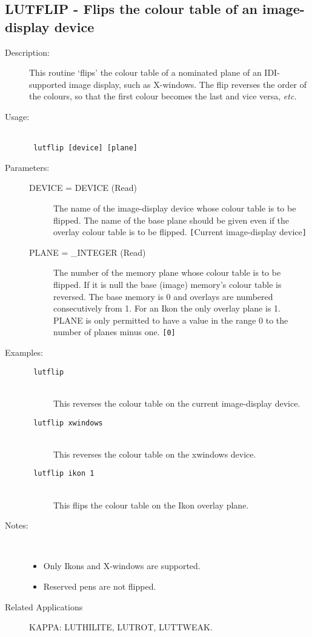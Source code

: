 \documentclass[twoside,11pt]{article}
\newcommand{\stardocinitials}  {SUN}
\newcommand{\stardocnumber}    {239.2}
\newcommand{\stardocname}{\stardocinitials /\stardocnumber}
\newcommand{\htmlref}[2]{#1}
\newcommand{\xlabel}[1]{}
\newlength{\sstbannerlength}
\newlength{\sstcaptionlength}
\newlength{\sstexampleslength}
\newlength{\sstexampleswidth}
\newcommand{\sstroutine}[3]{
   \goodbreak
   \markboth{{\stardocname}~ --- #1}{{\stardocname}~ --- #1}
   \rule{\textwidth}{0.5mm}
   \vspace{-7ex}
   \newline
   \settowidth{\sstbannerlength}{{\Large {\bf #1}}}
   \setlength{\sstcaptionlength}{\textwidth}
   \setlength{\sstexampleslength}{\textwidth}
   \addtolength{\sstbannerlength}{0.5em}
   \addtolength{\sstcaptionlength}{-2.0\sstbannerlength}
   \addtolength{\sstcaptionlength}{-4.9pt}
   \settowidth{\sstexampleswidth}{{\bf Examples:}}
   \addtolength{\sstexampleslength}{-\sstexampleswidth}
   \parbox[t]{\sstbannerlength}{\flushleft{\Large {\bf #1}}}
   \parbox[t]{\sstcaptionlength}{\center{\Large #2}}
   \parbox[t]{\sstbannerlength}{\flushright{\Large {\bf #1}}}
   \begin{description}
      #3
   \end{description}
}
\newcommand{\sstdescription}[1]{\item[Description:] #1}
\newcommand{\sstusage}[1]{\pagebreak[3] \item[Usage:] \mbox{} \\[1.3ex] {\ssttt #1}}
\newcommand{\sstparameters}[1]{
   \goodbreak 
   \item[Parameters:] \mbox{} \\
   \vspace{-3.5ex}
   \begin{description}
      #1
   \end{description}
}
\newcommand{\sstexamples}[1]{
   \goodbreak
   \item[Examples:] \mbox{} \\
   \vspace{-3.5ex}
   \begin{description}
      #1
   \end{description}
}
\newcommand{\sstsubsection}[1]{ \item[{#1}] \mbox{} \\}
\newcommand{\sstexamplesubsection}[2]{\sloppy \item{\ssttt #1} \mbox{} \\ #2 }
\newcommand{\sstnotes}[1]{\pagebreak[3] \item[Notes:] \mbox{} \\[1.3ex] #1}
\newcommand{\sstdiytopic}[2]{\goodbreak \item[{\hspace{-0.35em}#1\hspace{-0.35em}:}] \mbox{} \\[1.3ex] #2}
\newenvironment{sstitemize}{%
  \vspace{-4.3ex}\begin{itemize}}{\end{itemize}}
\newcommand{\sstitemlist}[1]{
  \mbox{} \\
  \vspace{-3.5ex}
  \begin{sstitemize}
     #1
  \end{sstitemize}
}
\newcommand{\sstitem}{\item}
\newcommand{\ssttt}{\tt}
\renewcommand{\sstroutine}[3]{
      \subsection{#1\xlabel{#1}-\label{#1}#2}
      \begin{description}
         #3
      \end{description}
   }
\renewcommand{\sstdescription}[1]{\item[Description:]
      \begin{description}
         #1
      \end{description}
   }
\renewcommand{\sstusage}[1]{\htmlref{\item[Usage:]}{ap:usage} \mbox{} \\ {\ssttt #1}}
\renewcommand{\sstparameters}[1]{
      \htmlref{\item[Parameters:]}{se:param}
      \begin{description}
         #1
      \end{description}
   }
\renewcommand{\sstexamples}[1]{
      \htmlref{\item[Examples:]}{ap:example}
      \begin{description}
         #1
      \end{description}
   }
\renewcommand{\sstsubsection}[1]{\item[{#1}]}
\renewcommand{\sstexamplesubsection}[2]{\item[{\ssttt #1}] \\ #2}
\renewcommand{\sstnotes}[1]{\item[Notes:]
      \begin{description}
         #1
      \end{description}
   }
\renewcommand{\sstdiytopic}[2]{\item[{#1}]
      \begin{description}
         #2
      \end{description}
   }
\newcommand{\sstitemlist}[1]{
      \begin{itemize}
         #1
      \end{itemize}
   }
\begin{document}
\sstroutine{
   LUTFLIP
}{
   Flips the colour table of an image-display device
}{
   \sstdescription{
      This routine `flips' the colour table of a nominated plane of
      an IDI-supported image display, such as X-windows.  The flip
      reverses the order of the colours, so that the first colour
      becomes the last and vice versa, {\it etc.}
   }
   \sstusage{
      lutflip [device] [plane]
   }
   \sstparameters{
      \sstsubsection{
         DEVICE = DEVICE (Read)
      }{
         The name of the image-display device whose colour table is to
         be flipped. The name of the base plane should be given even if
         the overlay colour table is to be flipped.
         {\tt [}Current image-display device{\tt ]}
      }
      \sstsubsection{
         PLANE = \_INTEGER (Read)
      }{
         The number of the memory plane whose colour table is to be
         flipped.  If it is null the base (image) memory's colour table
         is reversed. The base memory is 0 and overlays are numbered
         consecutively from 1.  For an Ikon the only overlay plane is 1.
         PLANE is only permitted to have a value in the range 0 to the
         number of planes minus one. {\tt [0]}
      }
   }
   \sstexamples{
      \sstexamplesubsection{
         lutflip
      }{
         This reverses the colour table on the current image-display
         device.
      }
      \sstexamplesubsection{
         lutflip xwindows
      }{
         This reverses the colour table on the xwindows device.
      }
      \sstexamplesubsection{
         lutflip ikon 1
      }{
         This flips the colour table on the Ikon overlay plane.
      }
   }
   \sstnotes{
      \sstitemlist{

         \sstitem
         Only Ikons and X-windows are supported.

         \sstitem
         Reserved pens are not flipped.
      }
   }
   \sstdiytopic{
      Related Applications
   }{
      KAPPA: LUTHILITE, LUTROT, LUTTWEAK.
   }
}
\end{document}
